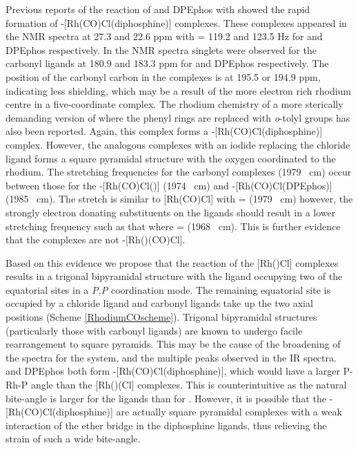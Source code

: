 Previous reports of the reaction of \Phxantphos{} and DPEphos with  showed the rapid formation of \trans-{[Rh(CO)Cl(diphosphine)]} complexes.\cite{Deb2010}  These complexes appeared in the \phosphorus{} NMR spectra at 27.3 and 22.6 ppm with \JRhP{} = 119.2 and 123.5 Hz for \Phxantphos{} and DPEphos respectively.  In the \carbon{} NMR spectra singlets were observed for the carbonyl ligands at 180.9 and 183.3 ppm for \Phxantphos{} and DPEphos respectively.  The position of the carbonyl carbon in the \tBuxantphos{} complexes is at 195.5 or 194.9 ppm, indicating less shielding, which may be a result of the more electron rich rhodium centre in a five-coordinate complex.  The rhodium chemistry of a more sterically demanding version of \Phxantphos{} where the phenyl rings are replaced with \emph{o}-tolyl groups has also been reported.\cite{Williams2011}  Again, this complex forms a \trans-[Rh(CO)Cl(diphosphine)] complex.  However, the analogous complexes with an iodide replacing the chloride ligand forms a square pyramidal structure with the oxygen coordinated to the rhodium.  The  stretching frequencies for the \tBuxantphos{} carbonyl complexes (1979 \si{\per\centi\metre}) occur between those for the \trans-[Rh(CO)Cl(\Phxantphos)] (1974 \si{\per\centi\metre}) and \trans-[Rh(CO)Cl(DPEphos)] (1985 \si{\per\cm}).  The  stretch is similar to [Rh(CO)Cl] with  =  (1979 \si{\per\centi\metre}) however, the strongly electron donating \tBu{} substituents on the \tBuxantphos{} ligands should result in a lower stretching frequency such as that where  =  (1968 \si{\per\cm}).\cite{Banger2009}  This is further evidence that the \tBuxantphos{} complexes are not \trans-[Rh(\tBuxantphos)(CO)Cl].  


Based on this evidence we propose that the reaction of the [Rh(\tBuxantphos)Cl] complexes results in a trigonal bipyramidal structure with the \tBuxantphos{} ligand occupying two of the equatorial sites in a \dento{}\emph{P,P}\textprime{} coordination mode.  The remaining equatorial site is occupied by a chloride ligand and carbonyl ligands take up the two axial positions (Scheme \ref{RhodiumCOscheme}).  Trigonal bipyramidal structures (particularly those with carbonyl ligands) are known to undergo facile rearrangement to square pyramids.\cite{Sanger1985} This may be the cause of the broadening of the spectra for the \tButhixantphos{} system, and the multiple peaks observed in the \gls{IR} spectra.  \Phxantphos{} and DPEphos both form \trans{}-[Rh(CO)Cl(diphosphine)], which would have a larger P-Rh-P angle than the [Rh(\tBuxantphos)(Cl] complexes.  This is counterintuitive as the natural bite-angle is larger for the \tBuxantphos{} ligands than for \Phxantphos{}.  However, it is possible that the \trans{}-[Rh(CO)Cl(diphosphine)] are actually square pyramidal complexes with a weak interaction of the ether bridge in the diphosphine ligands, thus relieving the strain of such a wide bite-angle.

